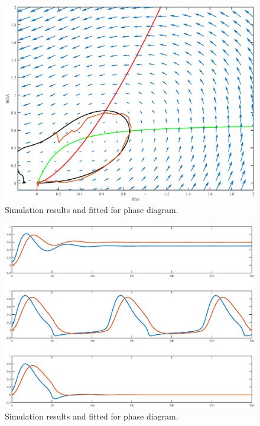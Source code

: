 \begin{figure}[h!]
\centering
\includegraphics[width=\hsize]{pulse/simple_model_fit_phase.eps}
\caption{\label{fig:pulse_fit_phase}  Simulation results and fitted for phase diagram.}
\end{figure}

\begin{figure}[h!]
\centering
\includegraphics[width=\hsize]{pulse/model_compare.eps}
\caption{\label{fig:pulse_fit_phase}  Simulation results and fitted for phase diagram.}
\end{figure}

